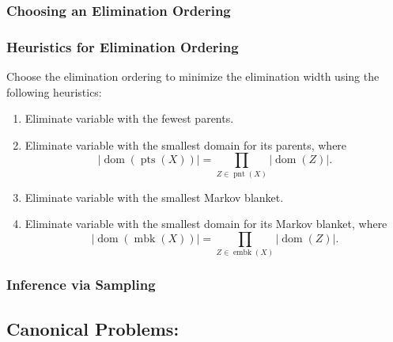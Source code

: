 \subsubsection{Choosing an Elimination Ordering}

\subsubsection{Heuristics for Elimination Ordering}
\begin{definition}
    Choose the elimination ordering to minimize the elimination width using the following heuristics:
    \begin{enumerate}
        \item Eliminate variable with the fewest parents.
        \item Eliminate variable with the smallest domain for its parents, where
        \[
        |\operatorname{dom}(\operatorname{pts}(X))| = \prod_{Z \in \operatorname{pnt}(X)} |\operatorname{dom}(Z)|.
        \]
        \item Eliminate variable with the smallest Markov blanket.
        \item Eliminate variable with the smallest domain for its Markov blanket, where
        \[
        |\operatorname{dom}(\operatorname{mbk}(X))| = \prod_{Z \in \operatorname{embk}(X)} |\operatorname{dom}(Z)|.
        \]
    \end{enumerate}
\end{definition}

\subsubsection{Inference via Sampling}
\begin{definition}
    
\end{definition}
\newpage

\subsection{Canonical Problems:}

